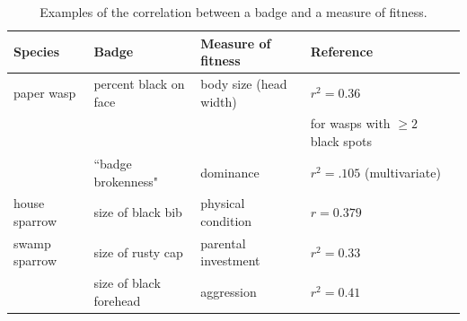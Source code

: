 \begin{table}
\caption{\label{corr_examples} Examples of the correlation between a badge and a measure of fitness.}
\begin{tabular}{lllll}
Species & Badge & Measure of fitness & Reference
\\\hline paper wasp & percent black on face & body size (head width) & $r^2=0.36$  & \cite{Tibbetts:2004kx}
\\ & & & for wasps with $\geq 2$ black spots
\\ & ``badge brokenness" & dominance & $r^2=.105$ (multivariate) & \cite{Tibbetts:2004kx}
\\ \hline house sparrow & size of black bib & physical condition & $r=0.379$ & \cite{Veiga:1993fk}
\\ \hline swamp sparrow & size of rusty cap & parental investment & $r^2=0.33$ & \cite{Olsen:2010uq}
\\ & size of black forehead & aggression & $r^2=0.41$ & \cite{Olsen:2010uq}
\end{tabular}
\end{table}


